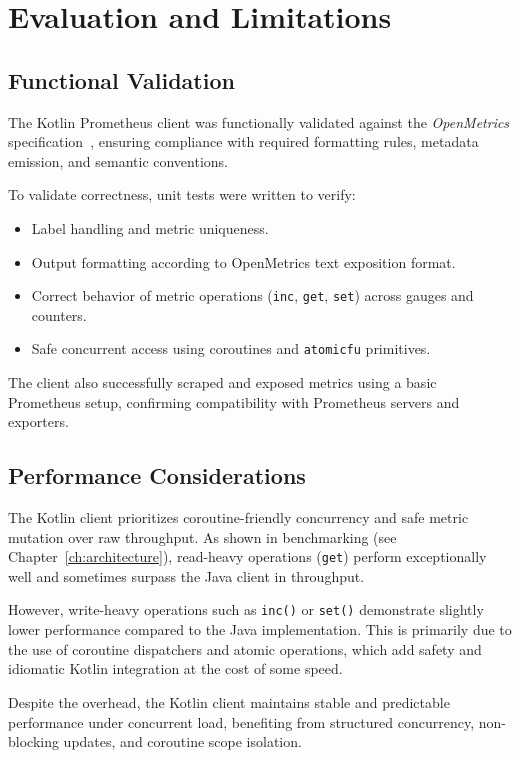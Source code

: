 \chapter{Evaluation and Limitations} \label{cap:evaluation}

\section{Functional Validation}

The Kotlin Prometheus client was functionally validated against the \textit{OpenMetrics} specification~\cite{openmetrics-spec}, ensuring compliance with required formatting rules, metadata emission, and semantic conventions.

To validate correctness, unit tests were written to verify:
\begin{itemize}
  \item Label handling and metric uniqueness.
  \item Output formatting according to OpenMetrics text exposition format.
  \item Correct behavior of metric operations (\texttt{inc}, \texttt{get}, \texttt{set}) across gauges and counters.
  \item Safe concurrent access using coroutines and \texttt{atomicfu} primitives.
\end{itemize}

The client also successfully scraped and exposed metrics using a basic Prometheus setup, confirming compatibility with Prometheus servers and exporters.

\section{Performance Considerations}

The Kotlin client prioritizes coroutine-friendly concurrency and safe metric mutation over raw throughput. As shown in benchmarking (see Chapter~\ref{ch:architecture}), read-heavy operations (\texttt{get}) perform exceptionally well and sometimes surpass the Java client in throughput.

However, write-heavy operations such as \texttt{inc()} or \texttt{set()} demonstrate slightly lower performance compared to the Java implementation. This is primarily due to the use of coroutine dispatchers and atomic operations, which add safety and idiomatic Kotlin integration at the cost of some speed.

Despite the overhead, the Kotlin client maintains stable and predictable performance under concurrent load, benefiting from structured concurrency, non-blocking updates, and coroutine scope isolation.

